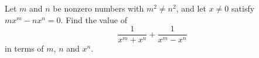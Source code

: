 Let $m$ and $n$ be nonzero numbers with $m^2\ne n^2$, and let $x\ne0$ satisfy $mx^m-nx^n=0$. Find the value of
\[
\dfrac{1}{x^m+x^n}+\dfrac{1}{x^m-x^n}
\]
in terms of $m$, $n$ and $x^n$.
